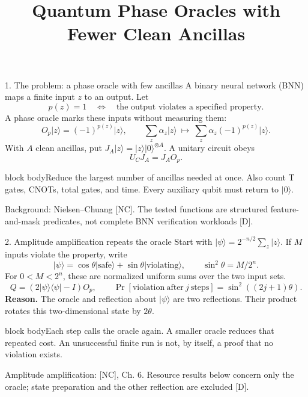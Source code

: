 \documentclass[aspectratio=169,11pt]{beamer}
\title{Quantum Phase Oracles with Fewer Clean Ancillas}
\author{}
\date{}
\newcommand{\ket}[1]{\lvert #1\rangle}
\newcommand{\bra}[1]{\langle #1\rvert}
\newcommand{\src}[1]{\par\vfill{\fontsize{6.6}{7.8}\selectfont\color{muted}#1\par}}
\newcommand{\takeaway}[1]{\par\smallskip\begin{beamercolorbox}[sep=1.4mm,wd=\linewidth]{block body}\small #1\end{beamercolorbox}}
\newcommand{\labeltext}[1]{{\color{accent}\bfseries #1}}
\begin{document}
\begin{frame}[t]{1. The problem: a phase oracle with few ancillas}
\small
A binary neural network (BNN) maps a finite input $z$ to an output. Let
\[
 p(z)=1\quad\Longleftrightarrow\quad\text{the output violates a specified property}.
\]
A phase oracle marks these inputs without measuring them:
\[
 O_p\ket z=(-1)^{p(z)}\ket z,
 \qquad \sum_z\alpha_z\ket z\ \longmapsto\ \sum_z\alpha_z(-1)^{p(z)}\ket z.
\]
With $A$ clean ancillas, put $J_A\ket z=\ket z\ket0^{\otimes A}$. A unitary circuit obeys
\[
 U_CJ_A=J_AO_p.
\]
\takeaway{Reduce the largest number of ancillas needed at once. Also count T gates, CNOTs, total gates, and time. Every auxiliary qubit must return to $\ket0$.}
\src{Background: Nielsen--Chuang [NC]. The tested functions are structured feature-and-mask predicates, not complete BNN verification workloads [D].}
\end{frame}

\begin{frame}[t]{2. Amplitude amplification repeats the oracle}
\small
Start with $\ket\psi=2^{-n/2}\sum_z\ket z$. If $M$ inputs violate the property, write
\[
 \ket\psi=\cos\theta\ket{\mathrm{safe}}+\sin\theta\ket{\mathrm{violating}},
 \qquad \sin^2\theta=M/2^n.
\]
For $0<M<2^n$, these are normalized uniform sums over the two input sets.
\[
 Q=(2\ket\psi\bra\psi-I)O_p,
 \qquad \Pr[\mathrm{violation\ after\ }j\mathrm{\ steps}]
       =\sin^2((2j+1)\theta).
\]
\labeltext{Reason.} The oracle and reflection about $\ket\psi$ are two reflections. Their product rotates this two-dimensional state by $2\theta$.
\takeaway{Each step calls the oracle again. A smaller oracle reduces that repeated cost. An unsuccessful finite run is not, by itself, a proof that no violation exists.}
\src{Amplitude amplification: [NC], Ch. 6. Resource results below concern only the oracle; state preparation and the other reflection are excluded [D].}
\end{frame}
\end{document}
